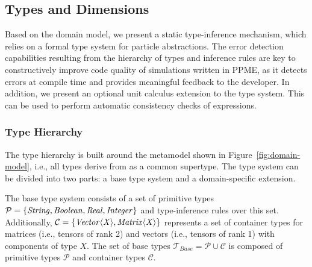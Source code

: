 
\subsection{Types and Dimensions} %
\label{sec:types_units}

  Based on the domain model, we present a static type-inference mechanism,
  which relies on a formal type system for particle abstractions. The error
  detection capabilities resulting from the hierarchy of types and inference rules
  are key to constructively improve code quality of simulations written
  in PPME, as it detects errors at compile time and provides meaningful feedback to
  the developer. In addition, we
  present an optional unit calculus extension to the type system. This can be used to perform automatic consistency checks of expressions.

\subsubsection{Type Hierarchy} %
\label{sub:type_hierarchy}
  The type hierarchy is built around the metamodel shown in
  Figure~\ref{fig:domain-model}, i.e., all types derive from  as a
  common supertype.  The type system can be divided into two parts: a base type
  system and a domain-specific extension.

  \newcommand{\TP}[2][Xdummy]{\ensuremath{\mathit{#2}\ifstrequal{#1}{Xdummy}{}{\langle\mathit{#1}\rangle}}}

  The base type system consists of a set of primitive types
    $\mathcal{P} = \{ \TP{String}, \TP{Boolean}, \TP{Real}, \TP{Integer} \}$
  and type-inference rules over this set.
  Additionally, $\mathcal{C} = \{ \TP[X]{Vector}, \TP[X]{Matrix} \}$ represents a set
  of container types for matrices (i.e., tensors of rank 2) and vectors (i.e., tensors of rank 1) with components of type $X$.
  The set of base types $\mathcal{T}_\mathit{Base} = \mathcal{P} \cup \mathcal{C}$ is
  composed of primitive types $\mathcal{P}$ and container types $\mathcal{C}$.

